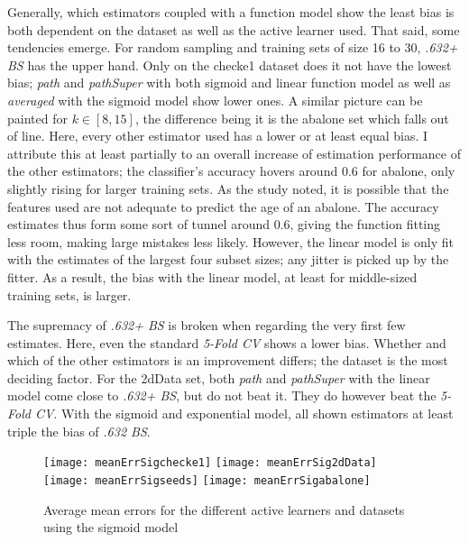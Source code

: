 Generally, which estimators coupled with a function model show the least bias is both dependent on the dataset as well as the active learner used. That said, some tendencies emerge. For random sampling and training sets of size 16 to 30, \textit{.632+ BS} has the upper hand. Only on the checke1 dataset does it not have the lowest bias; \textit{path} and \textit{pathSuper} with both sigmoid and linear function model as well as \textit{averaged} with the sigmoid model show lower ones. A similar picture can be painted for $k \in [8, 15]$, the difference being it is the abalone set which falls out of line. Here, every other estimator used has a lower or at least equal bias. I attribute this at least partially to an overall increase of estimation performance of the other estimators; the classifier's accuracy hovers around $0.6$ for abalone, only slightly rising for larger training sets. As the study noted, it is possible that the features used are not adequate to predict the age of an abalone. The accuracy estimates thus form some sort of tunnel around $0.6$, giving the function fitting less room, making large mistakes less likely. However, the linear model is only fit with the estimates of the largest four subset sizes; any jitter is picked up by the fitter. As a result, the bias with the linear model, at least for middle-sized training sets, is larger.

The supremacy of \textit{.632+ BS} is broken when regarding the very first few estimates. Here, even the standard \textit{5-Fold CV} shows a lower bias. Whether and which of the other estimators is an improvement differs; the dataset is the most deciding factor. For the 2dData set, both \textit{path} and \textit{pathSuper} with the linear model come close to \textit{.632+ BS}, but do not beat it. They do however beat the \textit{5-Fold CV}. With the sigmoid and exponential model, all shown estimators at least triple the bias of \textit{.632 BS}.

\begin{figure}[h]
	\centering
	\texttt{[image: meanErrSigchecke1]}
	\texttt{[image: meanErrSig2dData]}
	\texttt{[image: meanErrSigseeds]}
	\texttt{[image: meanErrSigabalone]}
	\caption{Average mean errors for the different active learners and datasets using the sigmoid model}
	\label{fig:meanErrorsSig}
\end{figure}

